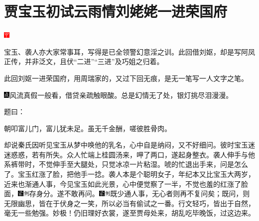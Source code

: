 

\chapter{贾宝玉初试云雨情\hspace{.5em}刘姥姥一进荣国府}

\includegraphics[width=3mm]{../Images/00002}{\kaishu 宝玉、袭人亦大家常事耳，写得是已全领警幻意淫之训。此回借刘妪，却是写阿凤正传，并非泛文，且伏``二进''``三进''及巧姐之归着。

此回刘妪一进荣国府，用周瑞家的，又过下回无痕，是无一笔写一人文字之笔。

\includegraphics[width=3mm]{../Images/00005}风流真假一般看，借贷亲疏触眼酸。总是幻情无了处，银灯挑尽泪漫漫。}

题曰：

朝叩富儿门，富儿犹未足。虽无千金酬，嗟彼胜骨肉。

却说秦氏因听见宝玉从梦中唤他的乳名，心中自是纳闷，又不好细问。彼时宝玉迷迷惑惑，若有所失。众人忙端上桂圆汤来，呷了两口，遂起身整衣。袭人伸手与他系裤带时，不觉伸手至大腿处，只觉冰凉一片粘湿。唬的忙退出手来，问是怎么了。宝玉红涨了脸，把他手一捻。袭人本是个聪明女子，年纪本又比宝玉大两岁，近来也渐通人事，今见宝玉如此光景，心中便觉察了一半，不觉也羞的红涨了脸面，{\includegraphics[width=3mm]{../Images/00006}\includegraphics[width=3mm]{../Images/00011}\footnotesize \kaishu 存身分。}遂不敢再问。{\includegraphics[width=3mm]{../Images/00006}\includegraphics[width=3mm]{../Images/00011}\footnotesize \kaishu 既少通人事，无心者则再不复问矣；既问，则无限幽思，皆在于伏身之一笑，所以必当有偷试之一番。行文轻巧，皆出于自然，毫无一些勉强。妙极！}仍旧理好衣裳，遂至贾母处来，胡乱吃毕晚饭，过这边来。

